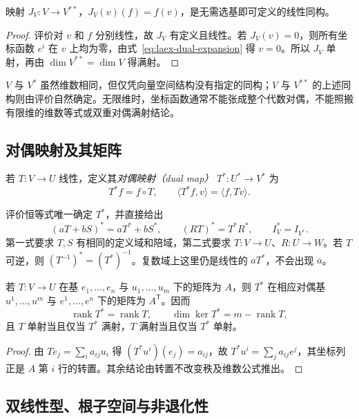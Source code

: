 \begin{proposition}
\label{prop:laex-double-dual}
映射 $J_V:V\to V^{**}$，$J_V(v)(f)=f(v)$，是无需选基即可定义的线性同构。
\end{proposition}
\begin{proof}
评价对 $v$ 和 $f$ 分别线性，故 $J_V$ 有定义且线性。若 $J_V(v)=0$，则所有坐标函数 $e^i$ 在 $v$ 上均为零，由式~\eqref{eq:laex-dual-expansion} 得 $v=0$。所以 $J_V$ 单射，再由 $\dim V^{**}=\dim V$ 得满射。
\end{proof}

$V$ 与 $V^*$ 虽然维数相同，但仅凭向量空间结构没有指定的同构；$V$ 与 $V^{**}$ 的上述同构则由评价自然确定。无限维时，坐标函数通常不能张成整个代数对偶，不能照搬有限维的维数等式或双重对偶满射结论。

\subsection{对偶映射及其矩阵}

\begin{definition}
若 $T:V\to U$ 线性，定义其\emph{对偶映射（dual map）} $T^*:U^*\to V^*$ 为
\begin{equation}
 T^*f=f\circ T,\qquad
 \langle T^*f,v\rangle=\langle f,Tv\rangle.
 \label{eq:laex-dual-map}
\end{equation}
\end{definition}

评价恒等式唯一确定 $T^*$，并直接给出
\[
 (aT+bS)^*=aT^*+bS^*,\qquad
 (RT)^*=T^*R^*,\qquad I_V^*=I_{V^*}.
\]
第一式要求 $T,S$ 有相同的定义域和陪域，第二式要求 $T:V\to U$、$R:U\to W$。若 $T$ 可逆，则 $(T^{-1})^*=(T^*)^{-1}$。复数域上这里仍是线性的 $aT^*$，不会出现 $\overline a$。

\begin{theorem}
\label{thm:laex-dual-transpose}
若 $T:V\to U$ 在基 $e_1,\ldots,e_n$ 与 $u_1,\ldots,u_m$ 下的矩阵为 $A$，则 $T^*$ 在相应对偶基 $u^1,\ldots,u^m$ 与 $e^1,\ldots,e^n$ 下的矩阵为 $A^{\mathsf T}$。因而
\[
 \operatorname{rank}T^*=\operatorname{rank}T,
 \qquad \dim\ker T^*=m-\operatorname{rank}T,
\]
且 $T$ 单射当且仅当 $T^*$ 满射，$T$ 满射当且仅当 $T^*$ 单射。
\end{theorem}
\begin{proof}
由 $Te_j=\sum_i a_{ij}u_i$ 得 $(T^*u^i)(e_j)=a_{ij}$，故 $T^*u^i=\sum_j a_{ij}e^j$，其坐标列正是 $A$ 第 $i$ 行的转置。其余结论由转置不改变秩及维数公式推出。
\end{proof}

\subsection{双线性型、根子空间与非退化性}

